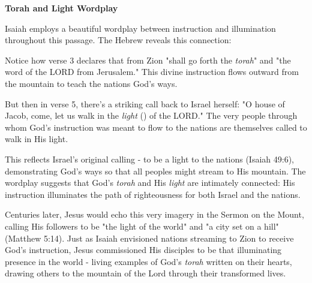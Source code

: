 \documentclass[11pt]{article}
\begin{document}
\newpage{}

{\large\bfseries Torah and Light Wordplay}
\vspace{1em}

Isaiah employs a beautiful wordplay between instruction and illumination throughout this passage. The Hebrew reveals this connection:

\vspace{1em}


\vspace{1em}
Notice how verse 3 declares that from Zion "shall go forth the \textit{torah}" and "the word of the LORD from Jerusalem." This divine instruction flows outward from the mountain to teach the nations God's ways. 

\vspace{1em}
But then in verse 5, there's a striking call back to Israel herself: "O house of Jacob, come, let us walk in the \textit{light} () of the LORD." The very people through whom God's instruction was meant to flow to the nations are themselves called to walk in His light.

\vspace{1em}
This reflects Israel's original calling - to be a light to the nations (Isaiah 49:6), demonstrating God's ways so that all peoples might stream to His mountain. The wordplay suggests that God's \textit{torah} and His \textit{light} are intimately connected: His instruction illuminates the path of righteousness for both Israel and the nations.

\vspace{1em}
Centuries later, Jesus would echo this very imagery in the Sermon on the Mount, calling His followers to be "the light of the world" and "a city set on a hill" (Matthew 5:14). Just as Isaiah envisioned nations streaming to Zion to receive God's instruction, Jesus commissioned His disciples to be that illuminating presence in the world - living examples of God's \textit{torah} written on their hearts, drawing others to the mountain of the Lord through their transformed lives.

\begin{thesauce}

\end{thesauce}
\end{document}
